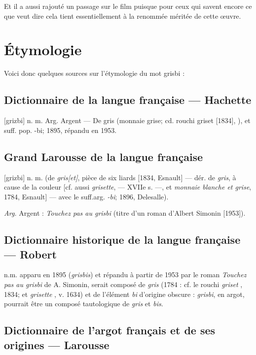 Et il a aussi rajouté un passage sur le film puisque pour ceux qui savent encore
ce que  veut dire cela tient essentiellement à la renommée méritée de cette \oe uvre.


\section{Étymologie\label{preamble-etymology}}


Voici donc quelques sources sur l'étymologie du mot grisbi :


\subsection*{Dictionnaire de la langue française --- Hachette}

[grizbi] n. m. Arg. Argent --- De gris (monnaie grise; cd. rouchi griset [1834], ), et suff. pop. -bi; 1895, répandu en 1953.


\subsection*{Grand Larousse de la langue française}

[grizbi] n. m. (de \emph{gris[et]}, pièce de six liards [1834, Esnault] --- dér.
de \emph{gris}, à cause de la couleur [cf. aussi \emph{grisette},  --- XVIIe s. ---, et \emph{monnaie blanche et grise}, 1784, Esnault] --- avec le suff.arg. \emph{-bi}; 1896, Delesalle).

\emph{Arg.} Argent : \emph{Touchez pas au grisbi} (titre d'un roman d'Albert
Simonin [1953]).


\subsection*{Dictionnaire historique de la langue française --- Robert}

n.m. apparu en 1895 (\emph{grisbis}) et répandu à partir de 1953 par le roman
\emph{Touchez pas au grisbi} de A. Simonin, serait composé de \emph{gris}
 (1784 : cf. le rouchi \emph{griset} , 1834; et \emph{grisette} , v. 1634) et de l'élément \emph{bi} d'origine obscure : \emph{grisbi},  en argot, pourrait être un composé tautologique de \emph{gris} et \emph{bis}.


\subsection*{Dictionnaire de l'argot français et de ses origines --- Larousse}

